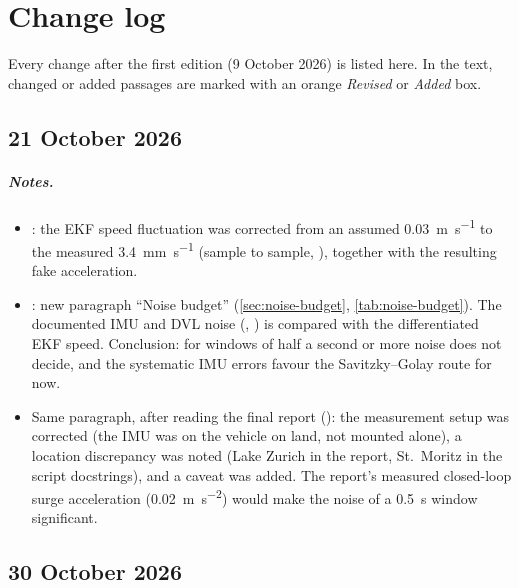 \chapter{Change log}
\label{app:changelog}

Every change after the first edition (9 October 2026) is listed here. In the text, changed or
added passages are marked with an orange \emph{Revised} or \emph{Added} box.

\section*{21 October 2026}

\paragraph{Notes.}
\begin{itemize}
  \item {}: the EKF speed fluctuation was corrected from an assumed
        \qty{0.03}{\metre\per\second} to the measured \qty{3.4}{\milli\metre\per\second}
        (sample to sample, ), together with the resulting fake
        acceleration.
  \item {}: new paragraph ``Noise budget'' (\cref{sec:noise-budget},
        \cref{tab:noise-budget}). The documented IMU and DVL noise
        (, ) is compared
        with the differentiated EKF speed. Conclusion: for windows of half a second or more noise
        does not decide, and the systematic IMU errors favour the Savitzky--Golay route for now.
  \item Same paragraph, after reading the final report ():
        the measurement setup was corrected (the IMU was on the vehicle on land, not mounted alone),
        a location discrepancy was noted (Lake Zurich in the report, St.~Moritz in the script
        docstrings), and a caveat was added. The report's measured closed-loop surge acceleration
        (\qty{0.02}{\metre\per\second\squared}) would make the noise of a \qty{0.5}{\second} window
        significant.
\end{itemize}

\section*{30 October 2026}

